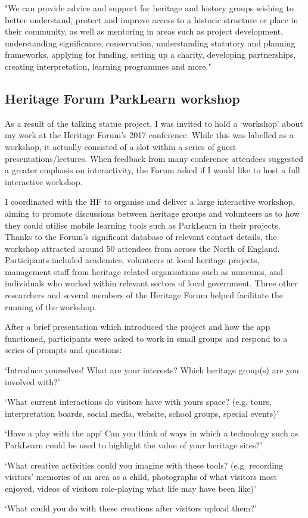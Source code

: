 \begin{displayquote}
"We can provide advice and support for heritage and history groups wishing to better understand, protect and improve access to a historic structure or place in their community, as well as mentoring in areas such as project development, understanding significance, conservation, understanding statutory and planning frameworks, applying for funding, setting up a charity, developing partnerships, creating interpretation, learning programmes and more."
\end{displayquote}

\subsection{Heritage Forum ParkLearn workshop}
As a result of the talking statue project, I was invited to hold a `workshop' about my work at the Heritage Forum's 2017 conference. While this was labelled as a workshop, it actually consisted of a slot within a series of guest presentations/lectures. When feedback from many conference attendees suggested a greater emphasis on interactivity, the Forum asked if I would like to host a full interactive workshop.

I coordinated with the HF to organise and deliver a large interactive workshop, aiming to promote discussions between heritage groups and volunteers as to how they could utilise mobile learning tools such as ParkLearn in their projects. Thanks to the Forum's significant database of relevant contact details, the workshop attracted around 50 attendees from across the North of England. Participants included academics, volunteers at local heritage projects, management staff from heritage related organisations such as museums, and individuals who worked within relevant sectors of local government. Three other researchers and several members of the Heritage Forum helped facilitate the running of the workshop.

After a brief presentation which introduced the project and how the app functioned, participants were asked to work in small groups and respond to a series of prompts and questions: 

\begin{displayquote}
`Introduce yourselves! What are your interests? Which heritage group(s) are you involved with?'

`What current interactions do visitors have with yours space? (e.g. tours, interpretation boards, social media, website, school groups, special events)'

`Have a play with the app! Can you think of ways in which a technology such as ParkLearn could be used to highlight the value of your heritage sites?'

`What creative activities could you imagine with these tools? (e.g. recording visitors' memories of an area as a child, photographs of what visitors most enjoyed, videos of visitors role-playing what life may have been like)'

`What could you do with these creations after visitors upload them?'
\end{displayquote}

